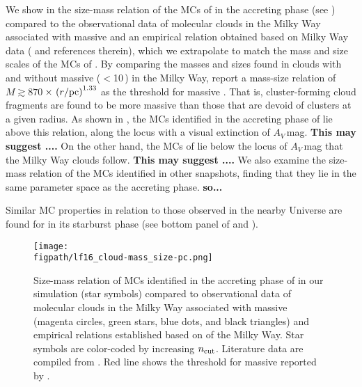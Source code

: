 \IfFileExists{emulateapjlegacy.cls}{\documentclass[iop]{emulateapjlegacy}}{\documentclass[iop]{emulateapj}}
\newcommand{\AP}[1]{({\bf \color{apcolor} AP: #1})}
\begin{document}
We show in  the size-mass relation of the MCs of \flower in the accreting phase (see )
compared to the 
observational data of molecular clouds in the Milky Way associated with massive \SF 
\citep{Beuther02a, Mueller02a, Hill05a, Motte07a} and an empirical relation obtained based on 
Milky Way data (\citealt{Kauffmann10b, Kauffmann10c} and references therein),
which we extrapolate to match the mass and size scales of the MCs of \flower.
By comparing the masses and sizes found in clouds with and without massive \SF ($<$10\,\Msun) 
in the Milky Way, \citet{Kauffmann10c} report a 
mass-size relation of $M \gtrsim 870$\,\Msun$\times\,\left(r/{\rm pc}\right)^{1.33}$ as the threshold for massive \SF. 
That is, cluster-forming cloud fragments are found to be more massive than those that are devoid of clusters 
at a given radius. As shown in , the MCs identified in the accreting phase of \flower lie above this relation, along the locus 
with a visual extinction of $A_V$\,mag. {\bf This may suggest ....}
On the other hand, the MCs of \flower lie below the locus of $A_V$\,mag that the Milky Way clouds follow.
{\bf This may suggest ....}
We also examine the size-mass relation of the MCs identified in other snapshots, finding that they lie in the same 
parameter space as the accreting phase. 
{\bf so...}

Similar MC properties in relation to those observed in the nearby Universe are found for \flower in its starburst phase (see bottom 
panel of  and ).

\begin{figure*}[htbp]
\centering
\texttt{[image: \\figpath/lf16\_cloud-mass\_size-pc.png]}
\caption{
Size-mass relation of MCs identified in the accreting phase of \flower in our simulation (star symbols) 
compared to observational data of molecular clouds in the Milky Way associated with massive \SF 
(magenta circles, green stars, blue dots, and black triangles) and empirical relations 
established based on \obs of the Milky Way.
Star symbols are color-coded by increasing $n_{\rm cut}$.
Literature data are compiled from \citet{Beuther02a, Mueller02a, Hill05a, Motte07a}.
Red line shows the threshold for massive \SF reported by \citet{Kauffmann10b}.
\label{fig:MR}}
\end{figure*}
\end{document}
